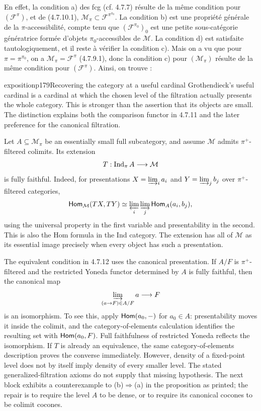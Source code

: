 \noindent{}En effet, la condition a) des fcg (cf. 4.7.7) résulte de la même condition pour $(\mathcal{F}^{\pi})$, et de (4.7.10.1), $\mathcal{M}_\pi\subset\mathcal{F}^{\pi^{\pi_0}}$. La condition b) est une propriété générale de la $\pi$-accessibilité, compte tenu que $(\mathcal{F}^{\pi_0})_0$ est une petite sous-catégorie génératrice formée d'objets $\pi_0$-accessibles de $\mathcal{M}$. La condition d) est satisfaite tautologiquement, et il reste à vérifier la condition c). Mais on a vu que pour $\pi=\pi^{\pi_0}$, on a $\mathcal{M}_\pi=\mathcal{F}^{\pi}$ (4.7.9.1), donc la condition c) pour $(\mathcal{M}_\pi)$ résulte de la même condition pour $(\mathcal{F}^{\pi})$. Ainsi, on trouve :

\begin{dcomment}{exposition}{p179}{Recovering the category at a useful cardinal}
Grothendieck's useful cardinal is a cardinal at which the chosen level of the filtration actually presents the whole category. This is stronger than the assertion that its objects are small. The distinction explains both the comparison functor in 4.7.11 and the later preference for the canonical filtration.

Let $A\subseteq\mathcal M_\pi$ be an essentially small full subcategory, and assume $\mathcal M$ admits $\pi^+$-filtered colimits. Its extension
\[
 T:\operatorname{Ind}_\pi A\longrightarrow\mathcal M
\]
is fully faithful. Indeed, for presentations $X=\varinjlim_i a_i$ and $Y=\varinjlim_j b_j$ over $\pi^+$-filtered categories,
\[
 \mathsf{Hom}_{\mathcal M}(TX,TY)
 \simeq \varprojlim_i\varinjlim_j\mathsf{Hom}_A(a_i,b_j),
\]
using the universal property in the first variable and presentability in the second. This is also the Hom formula in the Ind category. The extension has all of $\mathcal M$ as its essential image precisely when every object has such a presentation.

The equivalent condition in 4.7.12 uses the canonical presentation. If $A/F$ is $\pi^+$-filtered and the restricted Yoneda functor determined by $A$ is fully faithful, then the canonical map
\[
 \varinjlim_{(a\to F)\in A/F}a\longrightarrow F
\]
is an isomorphism. To see this, apply $\mathsf{Hom}(a_0,-)$ for $a_0\in A$: presentability moves it inside the colimit, and the category-of-elements calculation identifies the resulting set with $\mathsf{Hom}(a_0,F)$. Full faithfulness of restricted Yoneda reflects the isomorphism. If $T$ is already an equivalence, the same category-of-elements description proves the converse immediately. However, density of a fixed-point level does not by itself imply density of every smaller level. The stated generalized-filtration axioms do not supply that missing hypothesis. The next block exhibits a counterexample to (b)$\Rightarrow$(a) in the proposition as printed; the repair is to require the level $A$ to be dense, or to require its canonical cocones to be colimit cocones.


\end{dcomment}
